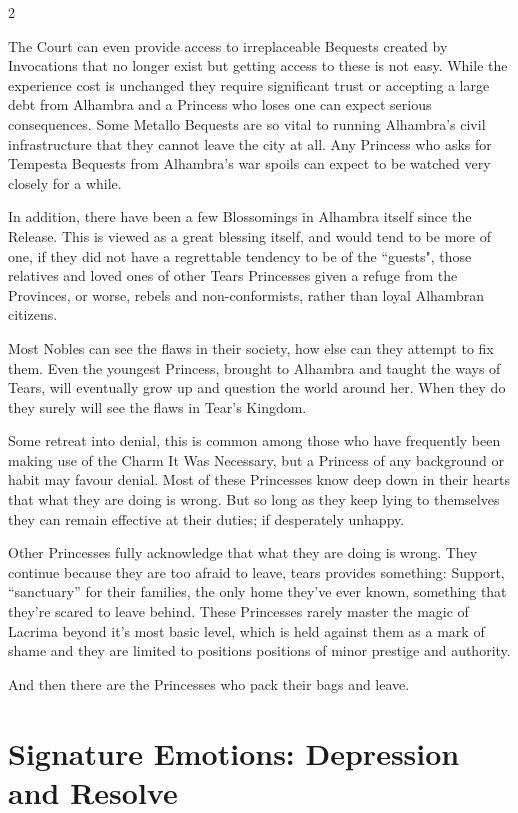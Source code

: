 \begin{multicols}{2}
\begin{mybox}
The Court can even provide access to irreplaceable Bequests created by Invocations that no longer exist but getting access to these is not easy. While the experience cost is unchanged they require significant trust or accepting a large debt from Alhambra and a Princess who loses one can expect serious consequences. Some Metallo Bequests are so vital to running Alhambra's civil infrastructure that they cannot leave the city at all. Any Princess who asks for Tempesta Bequests from Alhambra's war spoils can expect to be watched very closely for a while. 

\end{mybox}


In addition, there have been a few Blossomings in Alhambra itself since the Release. This is viewed as a great blessing itself, and would tend to be more of one, if they did not have a regrettable tendency to be of the \textquotedblleft guests", those relatives and loved ones of other Tears Princesses given a refuge from the Provinces, or worse, rebels and non-conformists, rather than loyal Alhambran citizens. 

Most Nobles can see the flaws in their society, how else can they attempt to fix them. Even the youngest Princess, brought to Alhambra and taught the ways of Tears, will eventually grow up and question the world around her. When they do they surely will see the flaws in Tear's Kingdom. 

Some retreat into denial, this is common among those who have frequently been making use of the Charm It Was Necessary, but a Princess of any background or habit may favour denial. Most of these Princesses know deep down in their hearts that what they are doing is wrong. But so long as they keep lying to themselves they can remain effective at their duties; if desperately unhappy. 

Other Princesses fully acknowledge that what they are doing is wrong. They continue because they are too afraid to leave, tears provides something: Support, \textquotedblleft sanctuary” for their families, the only home they've ever known, something that they're scared to leave behind. These Princesses rarely master the magic of Lacrima beyond it's most basic level, which is held against them as a mark of shame and they are limited to positions positions of minor prestige and authority.

And then there are the Princesses who pack their bags and leave.  

\section*{Signature Emotions: Depression and Resolve}


\end{multicols}
